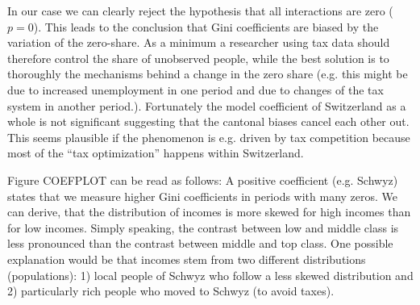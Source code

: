 \documentclass[twoside]{article}\usepackage[]{graphicx}\usepackage[]{color}
\begin{document}
\begin{multicols}{2}
In our case we can clearly reject the hypothesis that all interactions are zero ($p=0$). This leads to the conclusion that Gini coefficients are biased by the variation of the zero-share. As a minimum a researcher using tax data should therefore control the share of unobserved people, while the best solution is to thoroughly the mechanisms behind a change in the zero share (e.g. this might be due to increased unemployment in one period and due to changes of the tax system in another period.). Fortunately the model coefficient of Switzerland as a whole is not significant suggesting that the cantonal biases cancel each other out. This seems plausible if the phenomenon is e.g. driven by tax competition because most of the ``tax optimization'' happens within Switzerland.





Figure COEFPLOT can be read as follows: A positive coefficient (e.g. Schwyz) states that we measure higher Gini coefficients in periods with many zeros. We can derive, that the distribution of incomes is more skewed for high incomes than for low incomes. Simply speaking, the contrast between low and middle class is less pronounced than the contrast between middle and top class. One possible explanation would be that incomes stem from two different distributions (populations): 1) local people of Schwyz who follow a less skewed distribution and 2) particularly rich people who moved to Schwyz (to avoid taxes). 


\end{multicols}
\end{document}
